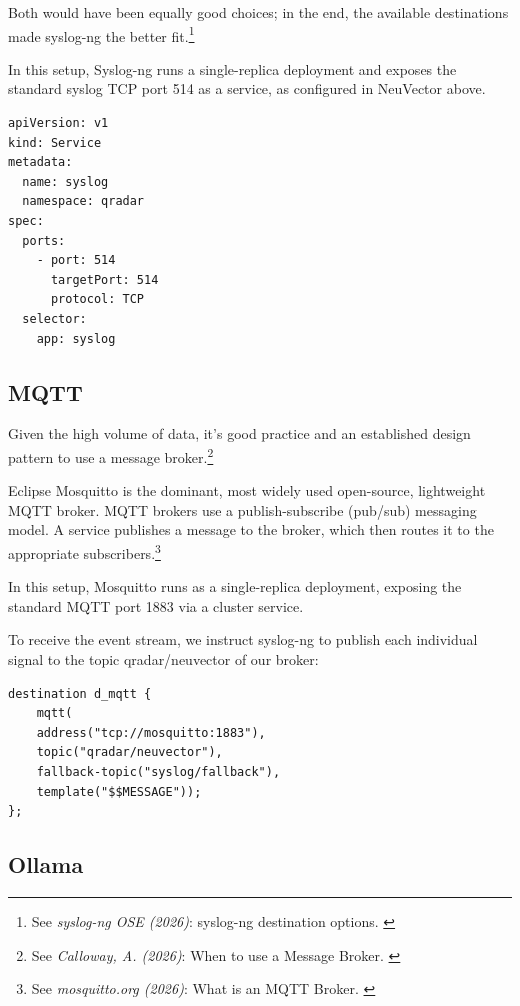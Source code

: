 Both would have been equally good choices; in the end, the available destinations made syslog-ng the better fit.\footnote{See \textit{syslog-ng OSE (2026)}: syslog-ng destination options. \cite{ngDestinations}}

In this setup, Syslog-ng runs a single-replica deployment and exposes the standard syslog TCP port 514 as a service, as configured in NeuVector above.

\begin{lstlisting}[caption=Syslog Service Definition, frame=single, basicstyle=\ttfamily\small, breaklines=true]
apiVersion: v1
kind: Service
metadata:
  name: syslog
  namespace: qradar
spec:
  ports:
    - port: 514
      targetPort: 514
      protocol: TCP
  selector:
    app: syslog

\end{lstlisting}

\subsection{MQTT}

Given the high volume of data, it's good practice and an established design pattern to use a message broker.\footnote {See \textit{Calloway, A. (2026)}: When to use a Message Broker. \cite{mqttPattern}}

Eclipse Mosquitto is the dominant, most widely used open-source, lightweight MQTT broker. MQTT brokers use a publish-subscribe (pub/sub) messaging model. A service publishes a message to the broker, which then routes it to the appropriate subscribers.\footnote {See \textit{mosquitto.org (2026)}: What is an MQTT Broker. \cite{whatBroker}}

In this setup, Mosquitto runs as a single-replica deployment, exposing the standard MQTT port 1883 via a cluster service.

To receive the event stream, we instruct syslog-ng to publish each individual signal to the topic qradar/neuvector of our broker:

\begin{lstlisting}[caption=Destination d-mqtt, frame=single, basicstyle=\ttfamily\small, breaklines=true]
destination d_mqtt {
    mqtt(
    address("tcp://mosquitto:1883"),
    topic("qradar/neuvector"),
    fallback-topic("syslog/fallback"),
    template("$$MESSAGE"));
};

\end{lstlisting}

\subsection{Ollama}

